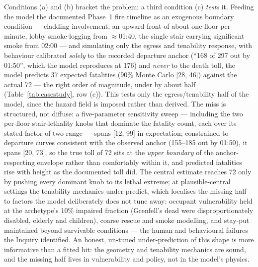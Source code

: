 Conditions (a) and (b) bracket the problem; a third condition (c) \emph{tests} it.
Feeding the model the documented Phase~1 fire timeline as an exogenous boundary
condition --- cladding involvement, an upward front of about one floor per minute,
lobby smoke-logging from $\approx$01:40, the single stair carrying significant smoke
from 02:00 --- and simulating only the egress and tenability response, with behaviour
calibrated \emph{solely} to the recorded departure anchor (``168 of 297 out by
01:50'', which the model reproduces at 176) and \emph{never} to the death toll, the
model predicts 37 expected fatalities (90\% Monte Carlo [28, 46]) against the actual
72 --- the right order of magnitude, under by about half (Table~\ref{tab:casestudy},
row (c)). This tests only the egress/tenability half of the model, since the hazard
field is imposed rather than derived. The miss is structured, not diffuse: a
five-parameter sensitivity sweep --- including the two per-floor stair-lethality
knobs that dominate the fatality count, each over its stated factor-of-two range ---
spans [12, 99] in expectation; constrained to departure curves consistent with the
observed anchor (155--185 out by 01:50), it spans [20, 73], so the true toll of 72
sits at the \emph{upper boundary} of the anchor-respecting envelope rather than
comfortably within it, and predicted fatalities rise with height as the documented
toll did. The central estimate reaches 72 only by pushing every dominant knob to its
lethal extreme; at plausible-central settings the tenability mechanics under-predict,
which localises the missing half to factors the model deliberately does not tune away:
occupant vulnerability held
at the archetype's 10\% impaired fraction (Grenfell's dead were disproportionately
disabled, elderly and children), coarse rescue and smoke modelling, and stay-put
maintained beyond survivable conditions --- the human and behavioural failures the
Inquiry identified. An honest, un-tuned under-prediction of this shape is more
informative than a fitted hit: the geometry and tenability mechanics are sound, and
the missing half lives in vulnerability and policy, not in the model's physics.

